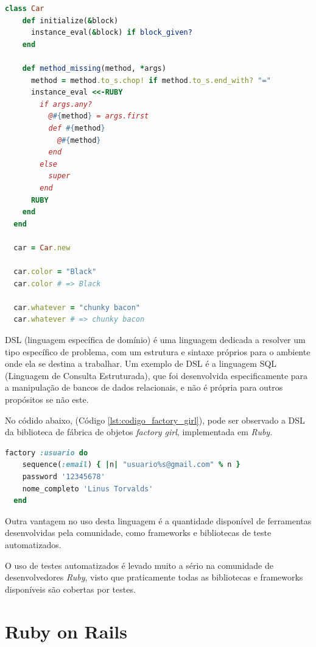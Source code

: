 {\singlespace
\begin{lstlisting}[caption=Metaprogramação em \textit{Ruby}, language=Ruby, label={lst:codigo_metaprogramacao}]
  class Car
    def initialize(&block)
      instance_eval(&block) if block_given?
    end

    def method_missing(method, *args)
      method = method.to_s.chop! if method.to_s.end_with? "="
      instance_eval <<-RUBY
        if args.any?
          @#{method} = args.first
          def #{method}
            @#{method}
          end
        else
          super
        end
      RUBY
    end
  end

  car = Car.new

  car.color = "Black"
  car.color # => Black

  car.whatever = "chunky bacon"
  car.whatever # => chunky bacon
\end{lstlisting}
}

DSL (linguagem específica de domínio) é uma linguagem dedicada a resolver um tipo específico de problema, com um estrutura e sintaxe próprios para o ambiente onde ela se destina a trabalhar. Um exemplo de DSL é a linguagem SQL (Linguagem de Consulta Estruturada), que foi desenvolvida especificamente para a manipulação de bancos de dados relacionais, e não é própria para outros propósitos se não este.

No códido abaixo, (Código \ref{lst:codigo_factory_girl}), pode ser observado a DSL da biblioteca de fábrica de objetos \textit{factory girl}, implementada em \textit{Ruby}.

{\singlespace
\begin{lstlisting}[caption=DSL da biblioteca \textit{factory girl}, language=Ruby, label={lst:codigo_factory_girl}]
  factory :usuario do
    sequence(:email) { |n| "usuario%s@gmail.com" % n }
    password '12345678'
    nome_completo 'Linus Torvalds'
  end
\end{lstlisting}
}

Outra vantagem no uso desta linguagem é a quantidade disponível de ferramentas desenvolvidas pela comunidade, como frameworks e bibliotecas de teste automatizados.

O uso de testes automatizados é levado muito a sério na comunidade de desenvolvedores \textit{Ruby}, visto que praticamente todas as bibliotecas e frameworks disponíveis são cobertas por testes.




\section{Ruby on Rails}

